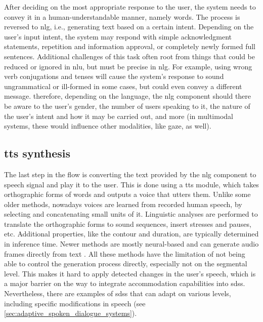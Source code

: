 After deciding on the most appropriate response to the user, the system needs to convey it in a human-understandable manner, namely words.
The process is reversed to \ac{nlg}, i.e., generating text based on a certain intent.
Depending on the user's input intent, the system may respond with simple acknowledgment statements, repetition and information approval, or completely newly formed full sentences.
Additional challenges of this task often root from things that could be reduced or ignored in \ac{nlu}, but must be precise in \ac{nlg}.
For example, using wrong verb conjugations and tenses will cause the system's response to sound ungrammatical or ill-formed in some cases, but could even convey a different message.
therefore, depending on the language, the \ac{nlg} component should there be aware to the user's gender, the number of users speaking to it, the nature of the user's intent and how it may be carried out, and more (in multimodal systems, these would influence other modalities, like gaze, as well).


\subsection{\Acl{tts} synthesis}
\label{subsec:text-to-speech_synthesis}

The last step in the flow is converting the text provided by the \ac{nlg} component to speech signal and play it to the user.
This is done using a \acf{tts} module, which takes orthographic forms of words and outputs a voice that utters them.
Unlike some older methods, nowadays voices are learned from recorded human speech, by selecting and concatenating small units of it.
Linguistic analyses are performed to translate the orthographic forms to sound sequences, insert stresses and pauses, etc.
Additional properties, like the contour and duration, are typically determined in inference time.
Newer methods are mostly neural-based and can generate audio frames directly from text \citep{Shen2018natural}.
All these methods have the limitation of not being able to control the generation process directly, especially not on the segmental level.
This makes it hard to apply detected changes in the user's speech, which is a major barrier on the way to integrate accommodation capabilities into \acp{sds}.
Nevertheless, there are examples of \acp{sds} that can adapt on various levels, including specific modifications in speech (see \cref{sec:adaptive_spoken_dialogue_systems}).


